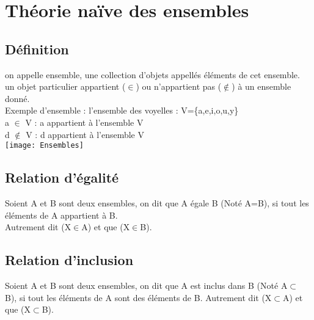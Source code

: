 \newpage

\section{Théorie naïve des ensembles}
\vspace{4mm} %

\subsection{Définition}
\vspace{4mm} %

on appelle ensemble, une collection d'objets appellés éléments de cet ensemble.\\
un objet particulier appartient ($\in$) ou n'appartient pas ($\notin$) à un ensemble donné.\\

Exemple d'ensemble : l'ensemble des voyelles : V=\{a,e,i,o,u,y\} \\

a $\in$ V : a appartient à l'ensemble V \\
d $\notin$ V : d appartient à l'ensemble V \\

\texttt{[image: Ensembles]}
\vspace{5mm} %

\subsection{Relation d'égalité}
\vspace{3mm} %

Soient A et B sont deux ensembles, on dit que A égale B (Noté A=B), si tout les éléments de A appartient à B.\\
Autrement dit (X$\in$A) et que (X$\in$B).\\

\subsection{Relation d'inclusion}
\vspace{3mm} %

Soient A et B sont deux ensembles, on dit que A est inclus dans B (Noté A$\subset$ B), si tout les éléments de A sont des éléments de B. Autrement dit (X$\subset$A) et que (X$\subset$B).\\

